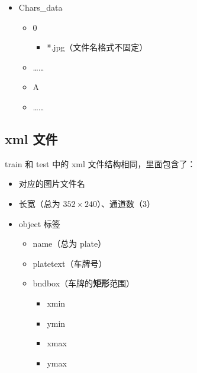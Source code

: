 \documentclass[UTF8]{article}
\begin{document}
\begin{multicols}{2}
\begin{itemize}
\begin{itemize}
\begin{itemize}
			\end{itemize}
		\end{itemize}
		\item Chars\_data
		\begin{itemize}
			\item 0
			\begin{itemize}
				\item *.jpg（文件名格式不固定）
			\end{itemize}
			\item ……
			\item A
			\item ……
		\end{itemize}
	\end{itemize}
	\end{multicols}

	\subsection{xml 文件}

	train 和 test 中的 xml 文件结构相同，里面包含了\cite{homework}：

	\begin{multicols}{2}
	\begin{itemize}
		\item 对应的图片文件名
		\item 长宽（总为 $352 \times 240$）、通道数（3）
		\item object 标签
		\begin{itemize}
			\item name（总为 plate）
			\item platetext（车牌号）
			\item bndbox（车牌的\textbf{矩形}范围）
			\begin{itemize}
				\item xmin
				\item ymin
				\item xmax
				\item ymax
			\end{itemize}
		\end{itemize}
	\end{itemize}
	\end{multicols}

	
\end{document}
